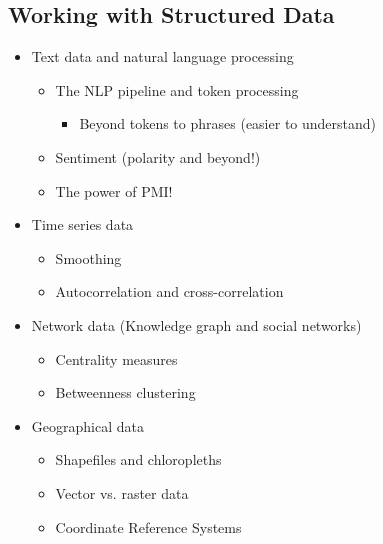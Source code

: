 \documentclass[11pt]{article}
\theoremstyle{definition}
\begin{document}
\subsection{Working with Structured Data}
\begin{itemize}
  \item Text data and natural language processing
  \begin{itemize}
    \item The NLP pipeline and token processing
    \begin{itemize}
      \item Beyond tokens to phrases (easier to understand)
    \end{itemize}
    \item Sentiment (polarity and beyond!)
    \item The power of PMI!
  \end{itemize}
  \item Time series data
  \begin{itemize}
    \item Smoothing
    \item Autocorrelation and cross-correlation
  \end{itemize}
  \item Network data (Knowledge graph and social networks)
  \begin{itemize}
    \item Centrality measures
    \item Betweenness clustering
  \end{itemize}
  \item Geographical data
  \begin{itemize}
    \item Shapefiles and chloropleths
    \item Vector vs. raster data
    \item Coordinate Reference Systems
  \end{itemize}
\end{itemize}
\end{document}
